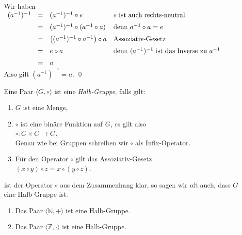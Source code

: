 \proof
Wir haben
\\[0.2cm]
\hspace*{1.3cm}
$
\begin{array}[t]{lcll}
  (a^{-1})^{-1} & = & (a^{-1})^{-1} \circ e
                    & \mbox{$e$ ist auch rechts-neutral}                      \\[0.2cm]
                & = & (a^{-1})^{-1} \circ (a^{-1} \circ a)
                    & \mbox{denn $a^{-1} \circ a = e$}                        \\[0.2cm]
                & = & \bigl((a^{-1})^{-1} \circ a^{-1}\bigr) \circ a
                    & \mbox{Assoziativ-Gesetz}                                \\[0.2cm]
                & = & e \circ a
                    & \mbox{denn $(a^{-1})^{-1}$ ist das Inverse zu $a^{-1}$} \\[0.2cm]
                & = & a
\end{array}
$
\\[0.2cm]
Also gilt $(a^{-1})^{-1} = a$. \qed


\begin{Definition}
  Eine Paar $\langle G, \circ \rangle$ ist eine \emph{Halb-Gruppe}, falls gilt:
  \begin{enumerate}
  \item $G$ ist eine Menge,
  \item $\circ$ ist eine bin\"{a}re Funktion auf $G$, es gilt also
        \\[0.2cm]
        \hspace*{1.3cm}
        $\circ: G \times G \rightarrow G$.
        \\[0.2cm]
        Genau wie bei Gruppen schreiben wir $\circ$ als Infix-Operator.
  \item F\"{u}r den Operator $\circ$ gilt das Assoziativ-Gesetz
        \\[0.2cm]
        \hspace*{1.3cm}
        $(x \circ y) \circ z = x \circ (y \circ z)$.
  \end{enumerate}
  Ist der Operator $\circ$ aus dem Zusammenhang klar, so sagen wir oft auch,
  dass $G$ eine Halb-Gruppe ist.
\end{Definition}

\examples
\begin{enumerate}
\item Das Paar $\langle \mathbb{N}, + \rangle$ ist eine Halb-Gruppe.
\item Das Paar $\langle \mathbb{Z}, \cdot \rangle$ ist eine Halb-Gruppe.
\end{enumerate}

